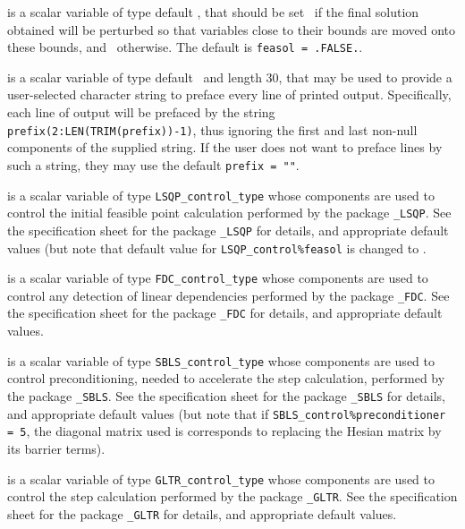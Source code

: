 \begin{description}
 is a scalar variable of type default \logical, that 
should be set \true\ 
if the final solution obtained will be perturbed 
so that variables close to their bounds are moved onto these bounds,
and \false\ otherwise. 
The default is {\tt feasol = .FALSE.}.


 is a scalar variable of type default \character\
and length 30, that may be used to provide a user-selected 
character string to preface every line of printed output. 
Specifically, each line of output will be prefaced by the string 
{\tt prefix(2:LEN(TRIM(prefix))-1)},
thus ignoring the first and last non-null components of the
supplied string. If the user does not want to preface lines by such
a string, they may use the default {\tt prefix = ""}.

 is a scalar variable of type 
{\tt LSQP\_control\_type}
whose components are used to control the initial feasible point calculation
performed by the package 
{\tt \libraryname\_LSQP}. 
See the specification sheet for the package 
{\tt \libraryname\_LSQP} 
for details, and appropriate default values (but note that default value for 
{\tt LSQP\_control\%feasol} is changed to \false.

 is a scalar variable of type 
{\tt FDC\_control\_type}
whose components are used to control any detection of linear dependencies
performed by the package 
{\tt \libraryname\_FDC}. 
See the specification sheet for the package 
{\tt \libraryname\_FDC} 
for details, and appropriate default values.

 is a scalar variable of type 
{\tt SBLS\_control\_type}
whose components are used to control preconditioning, needed to accelerate
the step calculation, 
performed by the package 
{\tt \libraryname\_SBLS}. 
See the specification sheet for the package 
{\tt \libraryname\_SBLS} 
for details, and appropriate default values (but note that if
{\tt SBLS\_control\%preconditioner = 5}, the diagonal matrix used is
corresponds to replacing the Hesian matrix by its barrier terms).

\itt{GLTR\_control} is a scalar variable of type 
{\tt GLTR\_control\_type}
whose components are used to control the step calculation
performed by the package 
{\tt \libraryname\_GLTR}. 
See the specification sheet for the package 
{\tt \libraryname\_GLTR} 
for details, and appropriate default values.

\end{description}
